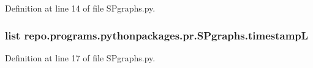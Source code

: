 Definition at line 14 of file S\-Pgraphs.\-py.

\hypertarget{namespacerepo_1_1programs_1_1pythonpackages_1_1pr_1_1SPgraphs_a04e4e5bc22270694ea4fbca149c08f09}{
\subsubsection[{timestamp\-L}]{\setlength{\rightskip}{0pt plus 5cm}list repo.\-programs.\-pythonpackages.\-pr.\-S\-Pgraphs.\-timestamp\-L}}\label{namespacerepo_1_1programs_1_1pythonpackages_1_1pr_1_1SPgraphs_a04e4e5bc22270694ea4fbca149c08f09}


Definition at line 17 of file S\-Pgraphs.\-py.

